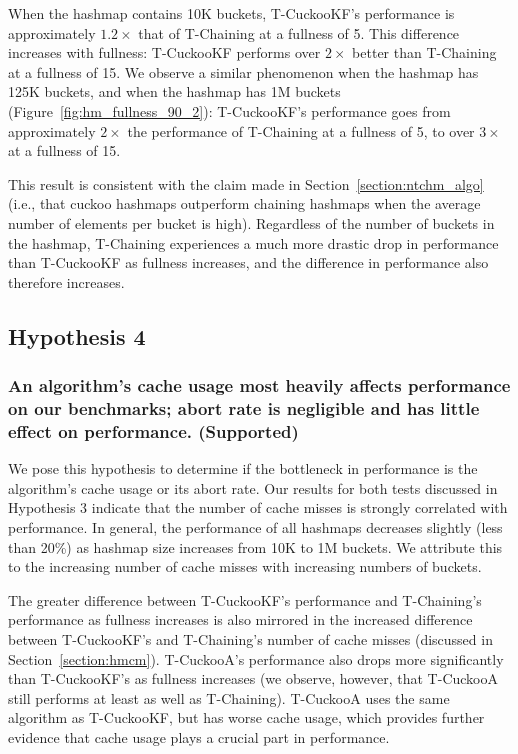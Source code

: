 When the hashmap contains 10K buckets, T-CuckooKF's performance is approximately $1.2\times$ that of T-Chaining at a fullness of 5. This difference increases with fullness: T-CuckooKF performs over $2\times$ better than T-Chaining at a fullness of 15.
We observe a similar phenomenon when the hashmap has 125K buckets, and when the hashmap has 1M buckets (Figure~\ref{fig:hm_fullness_90_2}): T-CuckooKF's performance goes from approximately $2\times$ the performance of T-Chaining at a fullness of 5, to over $3\times$ at a fullness of 15.
 
This result is consistent with the claim made in Section~\ref{section:ntchm_algo} (i.e., that cuckoo hashmaps outperform chaining hashmaps when the average number of elements per bucket is high).
Regardless of the number of buckets in the hashmap, T-Chaining experiences a much more drastic drop in performance than T-CuckooKF as fullness increases, and the difference in performance also therefore increases.

\vspace{12pt}
\noindent{}


\subsection{Hypothesis 4}
\subsubsection{An algorithm's cache usage most heavily affects performance on our benchmarks; abort rate is negligible and has little effect on performance. (Supported)}

    We pose this hypothesis to determine if the bottleneck in performance is the algorithm's cache usage or its abort rate. 
Our results for both tests discussed in Hypothesis 3 indicate that the number of cache misses is strongly correlated with performance. In general, the performance of all hashmaps decreases slightly (less than 20\%) as hashmap size increases from 10K to 1M buckets. We attribute this to the increasing number of cache misses with increasing numbers of buckets.

The greater difference between T-CuckooKF's performance and T-Chaining's performance as fullness increases is also mirrored in the increased difference between T-CuckooKF's and T-Chaining's number of cache misses (discussed in Section~\ref{section:hmcm}). T-CuckooA's performance also drops more significantly than T-CuckooKF's as fullness increases (we observe, however, that T-CuckooA still performs at least as well as T-Chaining). T-CuckooA uses the same algorithm as T-CuckooKF, but has worse cache usage, which provides further evidence that cache usage plays a crucial part in performance. 

